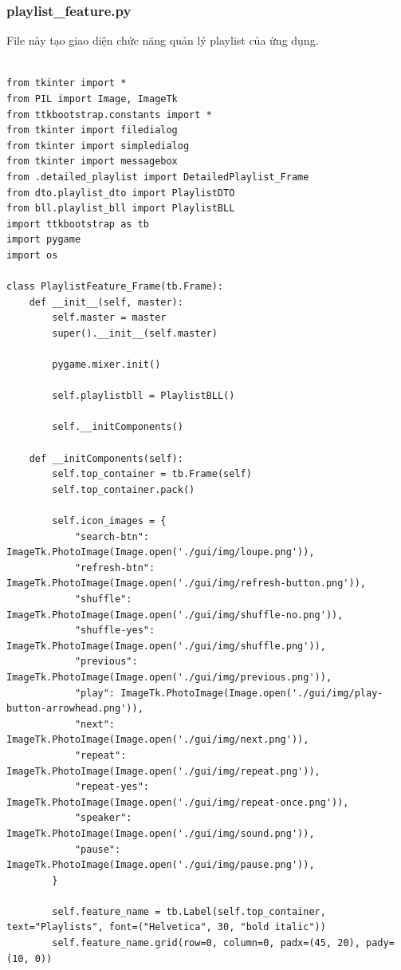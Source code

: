 \documentclass[a4paper]{article}
\begin{document}
\subsubsection{playlist\_feature.py}
File này tạo giao diện chức năng quản lý playlist của ứng dụng. 
\begin{mdframed}[hidealllines=true,backgroundcolor=magenta!10]
\begin{lstlisting}

from tkinter import *
from PIL import Image, ImageTk
from ttkbootstrap.constants import *
from tkinter import filedialog
from tkinter import simpledialog
from tkinter import messagebox
from .detailed_playlist import DetailedPlaylist_Frame
from dto.playlist_dto import PlaylistDTO
from bll.playlist_bll import PlaylistBLL
import ttkbootstrap as tb
import pygame
import os

class PlaylistFeature_Frame(tb.Frame):
    def __init__(self, master):
        self.master = master
        super().__init__(self.master)

        pygame.mixer.init()

        self.playlistbll = PlaylistBLL()

        self.__initComponents()

    def __initComponents(self):
        self.top_container = tb.Frame(self)
        self.top_container.pack()

        self.icon_images = {
            "search-btn": ImageTk.PhotoImage(Image.open('./gui/img/loupe.png')),
            "refresh-btn": ImageTk.PhotoImage(Image.open('./gui/img/refresh-button.png')),
            "shuffle": ImageTk.PhotoImage(Image.open('./gui/img/shuffle-no.png')),
            "shuffle-yes": ImageTk.PhotoImage(Image.open('./gui/img/shuffle.png')),
            "previous": ImageTk.PhotoImage(Image.open('./gui/img/previous.png')),
            "play": ImageTk.PhotoImage(Image.open('./gui/img/play-button-arrowhead.png')),
            "next": ImageTk.PhotoImage(Image.open('./gui/img/next.png')),
            "repeat": ImageTk.PhotoImage(Image.open('./gui/img/repeat.png')),
            "repeat-yes": ImageTk.PhotoImage(Image.open('./gui/img/repeat-once.png')),
            "speaker": ImageTk.PhotoImage(Image.open('./gui/img/sound.png')),
            "pause": ImageTk.PhotoImage(Image.open('./gui/img/pause.png')),
        }

        self.feature_name = tb.Label(self.top_container, text="Playlists", font=("Helvetica", 30, "bold italic"))
        self.feature_name.grid(row=0, column=0, padx=(45, 20), pady=(10, 0))


\end{lstlisting}
\end{mdframed}
\end{document}
